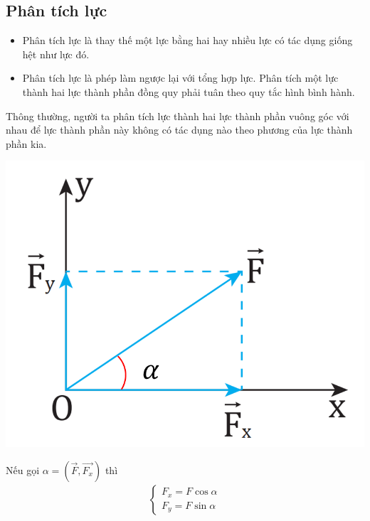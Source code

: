 \subsection{Phân tích lực}
\begin{itemize}
	\item Phân tích lực là thay thế một lực bằng hai hay nhiều lực có tác dụng giống hệt như lực đó.
	\item Phân tích lực là phép làm ngược lại với tổng hợp lực. Phân tích một lực thành hai lực thành phần đồng quy phải tuân theo quy tắc hình bình hành. 
\end{itemize}
Thông thường, người ta phân tích lực thành hai lực thành phần vuông góc với nhau để lực thành phần này không có tác dụng nào theo phương của lực thành phần kia.
\begin{center}
	\includegraphics[width=0.25\linewidth]{../figs/VN10-2023-PH-TP014-3}
\end{center}
Nếu gọi $\alpha=\left(\overrightarrow{F}, \overrightarrow{F_x}\right)$ thì 
\begin{align*}
	\begin{cases}
		F_x=F\cos\alpha\\
		F_y=F\sin\alpha
	\end{cases}
\end{align*}
